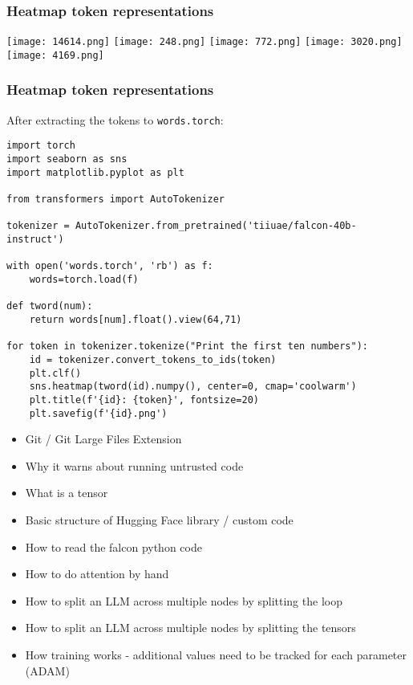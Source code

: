 \documentclass{beamer}
\begin{document}
\begin{frame}
\frametitle{Heatmap token representations}
\texttt{[image: 14614.png]}
\texttt{[image: 248.png]}
\texttt{[image: 772.png]}
\texttt{[image: 3020.png]}
\texttt{[image: 4169.png]}
\end{frame}

\begin{frame}[fragile]
\frametitle{Heatmap token representations}
After extracting the tokens to {\tt words.torch}:
\tiny\begin{verbatim}
import torch
import seaborn as sns
import matplotlib.pyplot as plt

from transformers import AutoTokenizer

tokenizer = AutoTokenizer.from_pretrained('tiiuae/falcon-40b-instruct')

with open('words.torch', 'rb') as f:
    words=torch.load(f)

def tword(num):
    return words[num].float().view(64,71)

for token in tokenizer.tokenize("Print the first ten numbers"):
    id = tokenizer.convert_tokens_to_ids(token)
    plt.clf()
    sns.heatmap(tword(id).numpy(), center=0, cmap='coolwarm')
    plt.title(f'{id}: {token}', fontsize=20)
    plt.savefig(f'{id}.png')

\end{verbatim}
\end{frame}

\begin{frame}
\begin{itemize}
\item Git / Git Large Files Extension
\item Why it warns about running untrusted code
\item What is a tensor
\item Basic structure of Hugging Face library / custom code
\item How to read the falcon python code
\item How to do attention by hand
\item How to split an LLM across multiple nodes by splitting the loop
\item How to split an LLM across multiple nodes by splitting the tensors
\item How training works - additional values need to be tracked for each parameter (ADAM)
\end{itemize}
\end{frame}
\end{document}
